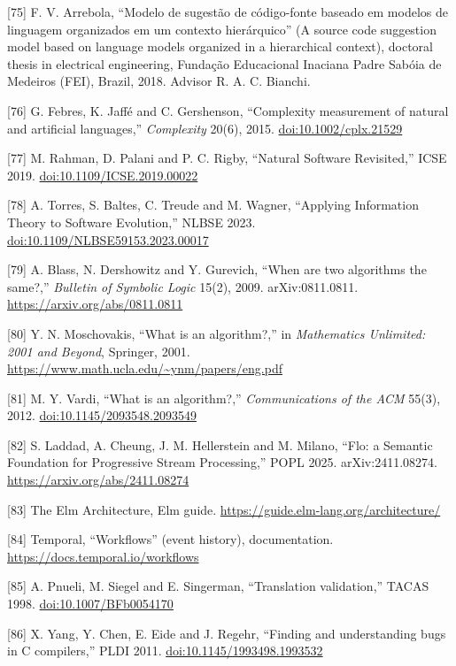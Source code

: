 \documentclass[10pt,letterpaper]{article}
\begin{document}
{[}75{]} F. V. Arrebola, ``Modelo de sugestão de código-fonte baseado em
modelos de linguagem organizados em um contexto hierárquico'' (A source
code suggestion model based on language models organized in a
hierarchical context), doctoral thesis in electrical engineering,
Fundação Educacional Inaciana Padre Sabóia de Medeiros (FEI), Brazil,
2018. Advisor R. A. C. Bianchi.

{[}76{]} G. Febres, K. Jaffé and C. Gershenson, ``Complexity measurement
of natural and artificial languages,'' \emph{Complexity} 20(6), 2015.
\href{https://doi.org/10.1002/cplx.21529}{doi:10.1002/cplx.21529}

{[}77{]} M. Rahman, D. Palani and P. C. Rigby, ``Natural Software
Revisited,'' ICSE 2019.
\href{https://doi.org/10.1109/ICSE.2019.00022}{doi:10.1109/ICSE.2019.00022}

{[}78{]} A. Torres, S. Baltes, C. Treude and M. Wagner, ``Applying
Information Theory to Software Evolution,'' NLBSE 2023.
\href{https://doi.org/10.1109/NLBSE59153.2023.00017}{doi:10.1109/NLBSE59153.2023.00017}

{[}79{]} A. Blass, N. Dershowitz and Y. Gurevich, ``When are two
algorithms the same?,'' \emph{Bulletin of Symbolic Logic} 15(2), 2009.
arXiv:0811.0811. \url{https://arxiv.org/abs/0811.0811}

{[}80{]} Y. N. Moschovakis, ``What is an algorithm?,'' in
\emph{Mathematics Unlimited: 2001 and Beyond}, Springer, 2001.
\url{https://www.math.ucla.edu/~ynm/papers/eng.pdf}

{[}81{]} M. Y. Vardi, ``What is an algorithm?,'' \emph{Communications of
the ACM} 55(3), 2012.
\href{https://doi.org/10.1145/2093548.2093549}{doi:10.1145/2093548.2093549}

{[}82{]} S. Laddad, A. Cheung, J. M. Hellerstein and M. Milano, ``Flo: a
Semantic Foundation for Progressive Stream Processing,'' POPL 2025.
arXiv:2411.08274. \url{https://arxiv.org/abs/2411.08274}

{[}83{]} The Elm Architecture, Elm guide.
\url{https://guide.elm-lang.org/architecture/}

{[}84{]} Temporal, ``Workflows'' (event history), documentation.
\url{https://docs.temporal.io/workflows}

{[}85{]} A. Pnueli, M. Siegel and E. Singerman, ``Translation
validation,'' TACAS 1998.
\href{https://doi.org/10.1007/BFb0054170}{doi:10.1007/BFb0054170}

{[}86{]} X. Yang, Y. Chen, E. Eide and J. Regehr, ``Finding and
understanding bugs in C compilers,'' PLDI 2011.
\href{https://doi.org/10.1145/1993498.1993532}{doi:10.1145/1993498.1993532}
\end{document}
